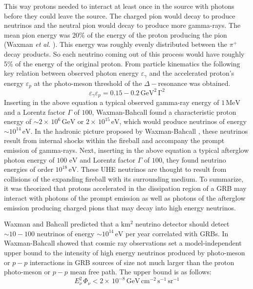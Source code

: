 \documentclass[12pt]{article}
\begin{document}
\begin{doublespace}
\begin{equation*}
\end{equation*}  
This way protons needed to interact at least once in the source with photons before they could leave the source. The charged pion would decay to produce neutrinos and the neutral pion would decay to produce more gamma-rays. The mean pion energy was 20\% of the energy of the proton producing the pion (Waxman \textit{et al.} \cite{firstcalc}). This energy was roughly evenly distributed between the $\pi^{+}$ decay products. So each neutrino coming out of this process would have roughly 5\% of the energy of the original proton. From particle kinematics the following key relation between observed photon energy $\varepsilon_\gamma$ and the accelerated proton's energy $\varepsilon_p$ at the photo-meson threshold of the $\Delta-$resonance was obtained. 
\begin{equation*}
\varepsilon_\gamma \varepsilon_p = 0.15 - 0.2 \, \mathrm{GeV^2 \, \Gamma^2}
\end{equation*}
Inserting in the above equation a typical observed gamma-ray energy of $1 \, \mathrm{MeV}$ and a Lorentz factor $\Gamma$ of $100$, Waxman-Bahcall found a characteristic proton energy of $\sim 2 \times \, 10^{6} \, \mathrm{GeV}$ or $2 \times \, 10^{15} \, \mathrm{eV}$, which would produce neutrinos of energy $\sim 10^{14} \, \mathrm{eV}$. In the hadronic picture proposed by Waxman-Bahcall \cite{firstcalc,WBub,afterglows,ubrobust}, these neutrinos result from internal shocks within the fireball and accompany the prompt emission of gamma-rays. Next, inserting in the above equation a typical afterglow photon energy of $100 \,\, \mathrm{eV}$ and Lorentz factor $\Gamma$ of $100$, they found neutrino energies of order $10^{18} \, \mathrm{eV}$. These UHE neutrinos are thought to result from collisions of the expanding fireball with its surrounding medium. To summarize, it was theorized that protons accelerated in the dissipation region of a GRB may interact with photons of the prompt emission as well as photons of the afterglow emission producing charged pions that may decay into high energy neutrinos. \par
Waxman and Bahcall \cite{firstcalc} predicted that a $\mathrm{km^2}$ neutrino detector should detect $\sim 10 - 100$ neutrinos of energy $\sim 10^{14} \, \mathrm{eV}$ per year correlated with GRBs. In \cite{WBub} Waxman-Bahcall showed that cosmic ray observations set a model-independent upper bound to the intensity of high energy neutrinos produced by photo-meson or $p-p$ interactions in GRB sources of size not much larger than the proton photo-meson or $p-p$ mean free path. The upper bound is as follows: 
\begin{equation*}
E_{\nu}^2 \, \Phi_{\nu}<2 \times \, 10^{-8}\, \mathrm{GeV \, cm^{-2} \, s^{-1} \, sr^{-1}}
\end{equation*}


\end{doublespace}
\end{document}
